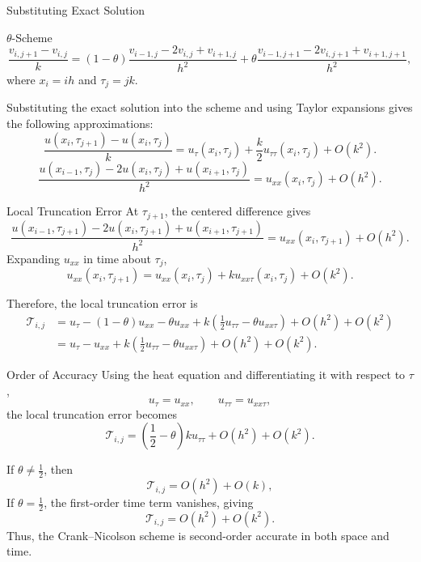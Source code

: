 \documentclass{beamer}
\begin{document}
\begin{frame}{Substituting Exact Solution}
\begin{block}{$\theta$-Scheme}
\[
\frac{v_{i,j+1}-v_{i,j}}{k}
=
(1-\theta)\frac{v_{i-1,j}-2v_{i,j}+v_{i+1,j}}{h^2}
+\theta\frac{v_{i-1,j+1}-2v_{i,j+1}+v_{i+1,j+1}}{h^2},
\]
where $x_i=ih$ and $\tau_j=jk$.
\end{block}
Substituting the exact solution into the scheme and using Taylor
expansions gives the following approximations:
\[
\frac{u(x_i,\tau_{j+1})-u(x_i,\tau_j)}{k}
=
u_\tau(x_i,\tau_j)
+\frac{k}{2}u_{\tau\tau}(x_i,\tau_j)
+O(k^2).
\]
\[
\frac{u(x_{i-1},\tau_j)-2u(x_i,\tau_j)+u(x_{i+1},\tau_j)}{h^2}
=
u_{xx}(x_i,\tau_j)+O(h^2).
\]
\end{frame}

\begin{frame}{Local Truncation Error}
At $\tau_{j+1}$, the centered difference gives
\[
\frac{u(x_{i-1},\tau_{j+1})-2u(x_i,\tau_{j+1})+u(x_{i+1},\tau_{j+1})}{h^2}
=
u_{xx}(x_i,\tau_{j+1})+O(h^2).
\]
Expanding $u_{xx}$ in time about $\tau_j$,
\[
u_{xx}(x_i,\tau_{j+1})
=
u_{xx}(x_i,\tau_j)+k u_{xx\tau}(x_i,\tau_j)+O(k^2).
\]

Therefore, the local truncation error is
\[
\begin{aligned}
\mathcal{T}_{i,j}
&=
u_\tau-(1-\theta)u_{xx}-\theta u_{xx}
+k\left(\frac12u_{\tau\tau}-\theta u_{xx\tau}\right)
+O(h^2)+O(k^2)\\
&=
{u_\tau-u_{xx}}
+k\left(\frac12u_{\tau\tau}-\theta u_{xx\tau}\right)
+O(h^2)+O(k^2).
\end{aligned}
\]
\end{frame}

\begin{frame}{Order of Accuracy}
Using the heat equation and differentiating it with respect to $\tau$,
\[
u_\tau=u_{xx},
\qquad
u_{\tau\tau}=u_{xx\tau},
\]
the local truncation error becomes
\[
\mathcal{T}_{i,j}
=
\left(\frac12-\theta\right)k u_{\tau\tau}
+O(h^2)+O(k^2).
\]

If $\theta\neq\frac12$, then
\[
\boxed{\mathcal{T}_{i,j}=O(h^2)+O(k),}
\]
If $\theta=\frac12$, the first-order time term vanishes, giving
\[
\boxed{\mathcal{T}_{i,j}=O(h^2)+O(k^2).}
\]
Thus, the Crank--Nicolson scheme is second-order accurate in both space and time.

\end{frame}
\end{document}
